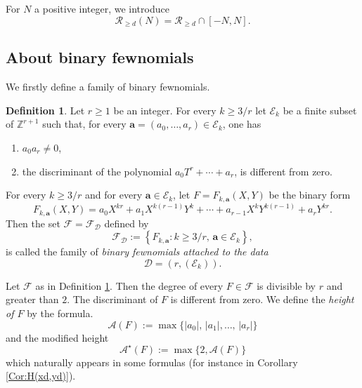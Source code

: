 \documentclass[10pt]{article}
\theoremstyle{definition}
\newtheorem{definition}[theorem]{Definition}
\numberwithin{equation}{section}
\newcommand {\Z}{{\mathbb{Z}}}
\newcommand{\calA}{\mathcal {A}}
\newcommand{\calR}{\mathcal {R}}
\begin{document}
 For $N$ a positive integer, we introduce
 \begin{equation}\label{Equation:RdN}
 \calR_{\geqslant d}(N)=\calR_{\geqslant d}\cap[-N,N].
 \end{equation}
 
\subsection{About binary fewnomials} \label{S:Fewnomial}

We firstly define a family of binary fewnomials.
\begin{definition}\label{fewnomial} Let $r\geqslant 1$ be an integer. For every $k\geqslant 3/r$ let $\mathcal E_k$ be a finite subset of $\Z^{r+1}$
such that, for every $\boldsymbol a =(a_0, \dots, a_r) \in \mathcal E_k$, one has 
\begin{enumerate}
\item $a_0 a_r\not= 0$,
\item the discriminant of the polynomial $a_0T^r+ \cdots +a_r$, is different from zero.
\end{enumerate} For every $k\geqslant 3/r$ and 
for every $\boldsymbol a\in \mathcal E_k$, let $F=F_{k,\boldsymbol a}(X,Y)$ be the binary form
\begin{equation}\label{278bis}
F_{k, \boldsymbol a} (X,Y)= a_0 X^{kr} +a_1 X^{k(r-1)} Y^k +\cdots +a_{r-1}X^k Y^{k(r-1)} + a_r Y^{kr}.
\end{equation}
Then the set $\mathcal F= \mathcal F_{\boldsymbol{\mathcal D}}$ defined by 
 \[
 \mathcal F_{\boldsymbol{\mathcal D}}:=
\left\{ F_{k, \boldsymbol a} : k\geqslant 3/r, \, \boldsymbol a \in \mathcal E_k \right\},
\]
is called the family of {\em binary fewnomials attached to the data } 
\begin{equation*} 
{\boldsymbol {\mathcal D}}=(r, (\mathcal E_k)).
\end{equation*}
\end{definition}
Let $\mathcal F$ as in Definition \ref{fewnomial}. Then the degree of every $F\in \mathcal F$ is divisible by $r$
and greater than $2$. The discriminant of $F$ is different from zero. We define the {\em height of $F$} by the formula.
\begin{equation}\label{Equation:calA}
 \calA(F):=\max\{\vert a_0\vert,\, \vert a_1\vert,\dots,\, \vert a_r\vert \}
\end{equation}
and the modified height 
\[
\calA^\star(F):=\max\{2,\calA(F)\}
\] 
which naturally appears in some formulas (for instance in Corollary \ref{Cor:H(xd,yd)}).
\end{document}
